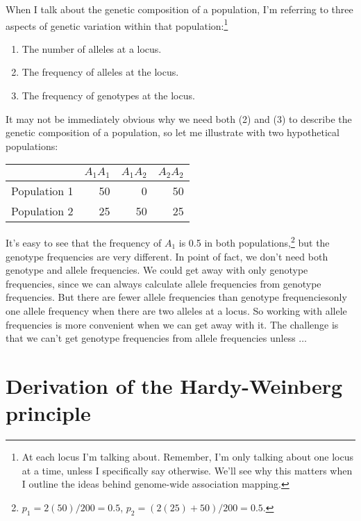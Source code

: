When I talk about the genetic composition of a population, I'm
referring to three aspects of genetic variation within that
population:\footnote{At each locus I'm talking about. Remember, I'm
  only talking about one locus at a time, unless I specifically say
  otherwise. We'll see why this matters when I outline the ideas
  behind genome-wide association mapping.} 
\begin{enumerate}

\item The number of alleles at a locus.

\item The frequency of alleles at the locus.

\item The frequency of genotypes at the locus.

\end{enumerate}
It may not be immediately obvious why we need both (2) and
(3) to describe the genetic composition of a population, so let me
illustrate with two hypothetical populations:
\begin{center}
\begin{tabular}{lrrr}
             & $A_1A_1$ & $A_1A_2$ & $A_2A_2$ \\
\hline\hline
Population 1 &       50 &        0 &       50 \\
Population 2 &       25 &       50 &       25 \\
\hline
\end{tabular}
\end{center}
It's easy to see that the frequency of $A_1$ is 0.5 in both
populations,\footnote{$p_1 = 2(50)/200 = 0.5$,
  $p_2 = (2(25) + 50)/200 = 0.5$.} but the genotype frequencies are
very different. In point of fact, we don't need both genotype and
allele frequencies. We could get away with only genotype frequencies,
since we can always calculate allele frequencies from genotype
frequencies. But there are fewer allele frequencies than genotype
frequencies{\dash}only one allele frequency when there are two alleles
at a locus. So working with allele frequencies is more convenient when
we can get away with it. The challenge is that we can't get genotype
frequencies from allele frequencies unless $\dots$

\section*{Derivation of the Hardy-Weinberg principle}

